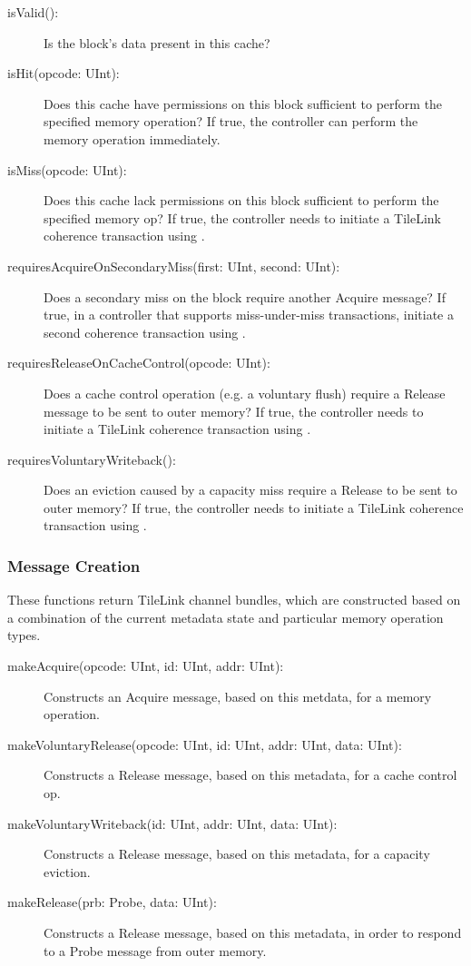 \begin{description}
\item[isValid():]
Is the block's data present in this cache?
\item[isHit(opcode: UInt):]
Does this cache have permissions on this block sufficient to perform the specified memory operation?
If true, the controller can perform the memory operation immediately.
\item[isMiss(opcode: UInt):]
Does this cache lack permissions on this block sufficient to perform the specified memory op?
If true, the controller needs to initiate a TileLink coherence transaction using .
\item[requiresAcquireOnSecondaryMiss(first: UInt, second: UInt):]
Does a secondary miss on the block require another Acquire message?
If true, in a controller that supports miss-under-miss transactions, initiate a second coherence transaction using .
\item[requiresReleaseOnCacheControl(opcode: UInt):]
Does a cache control operation (e.g. a voluntary flush) require a Release message to be sent to outer memory?
If true, the controller needs to initiate a TileLink coherence transaction using .
\item[requiresVoluntaryWriteback():]
Does an eviction caused by a capacity miss require a Release to be sent to outer memory?
If true, the controller needs to initiate a TileLink coherence transaction using .
\end{description}


\subsubsection{Message Creation}

These functions return TileLink channel bundles,
which are constructed  based on a combination of the current metadata state
and particular memory operation types.

\begin{description}
\item[makeAcquire(opcode: UInt, id: UInt, addr: UInt):]
Constructs an Acquire message, based on this metdata, for a memory operation.
\item[makeVoluntaryRelease(opcode: UInt, id: UInt, addr: UInt, data: UInt):]
Constructs a Release message, based on this metadata, for a cache control op.
\item[makeVoluntaryWriteback(id: UInt, addr: UInt, data: UInt):]
Constructs a Release message, based on this metadata, for a capacity eviction.
\item[makeRelease(prb: Probe, data: UInt):]
Constructs a Release message, based on this metadata, in order to respond to a Probe message from outer memory.
\end{description}

